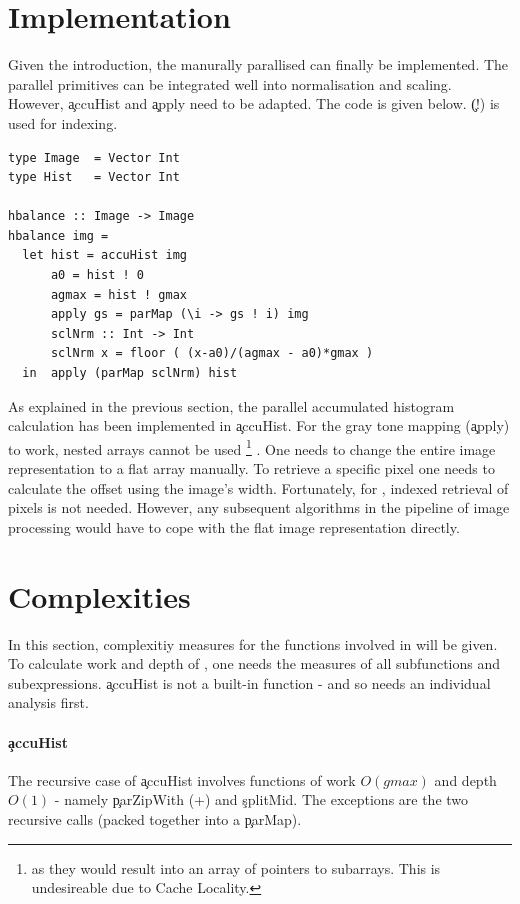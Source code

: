 \section{Implementation}
  Given the introduction, the manurally parallised \man can finally be implemented.
  The parallel primitives can be integrated
  well into normalisation and scaling.
  However, \c{accuHist} and \c{apply} need to be adapted.
  The code is given below. \c{(!)} is used for indexing.
  \begin{lstlisting}
type Image  = Vector Int
type Hist   = Vector Int

hbalance :: Image -> Image
hbalance img =
  let hist = accuHist img
      a0 = hist ! 0
      agmax = hist ! gmax
      apply gs = parMap (\i -> gs ! i) img
      sclNrm :: Int -> Int
      sclNrm x = floor ( (x-a0)/(agmax - a0)*gmax )
  in  apply (parMap sclNrm) hist
  \end{lstlisting}
  As explained in the previous section, the parallel
  accumulated histogram calculation has been implemented in \c{accuHist}.
  For the gray tone mapping (\c{apply}) to work, nested arrays cannot be used
  \footnote{as they would result into an array of pointers to subarrays.
  This is undesireable due to Cache Locality.}
  .
  One needs to change the entire image representation to a flat array manually.
  To retrieve a specific pixel one needs to calculate
  the offset using the image's width. Fortunately,
  for \algo, indexed retrieval of pixels is not needed.
  However, any subsequent algorithms in the pipeline of image processing
  would have to cope with the flat image representation directly.
    
\section{Complexities}
  In this section, complexitiy measures for the functions
  involved in \man will be given.
  To calculate work and depth of \man, one needs the measures of
  all subfunctions and subexpressions. \c{accuHist} is
  not a built-in function - and so needs an individual analysis first.
  
  \paragraph{\c{accuHist}}
    The recursive case of \c{accuHist} involves functions
    of work $O(gmax)$ and depth $O(1)$ - 
    namely \c{parZipWith (+)} and \c{splitMid}.
    The exceptions are the two recursive calls (packed together into a
    \c{parMap}).
    
